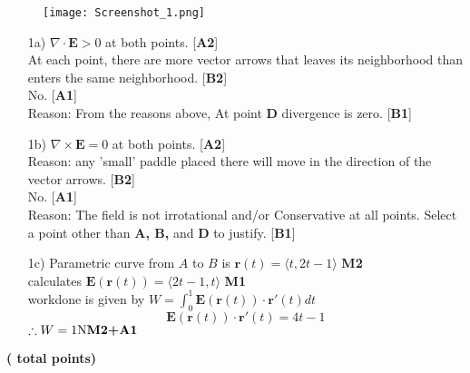 \documentclass[12pt]{exam}
\newcommand{\vr}{\mathbf{r}}
\newcommand{\vE}{\mathbf{E}}
\begin{document}
\begin{questions}
	\begin{figure}[h!]
		\centering
		\texttt{[image: Screenshot\_1.png]}
	\end{figure}
\begin{solution}
	\begin{enumerate}
		\item[1a) ]  $\nabla \cdot \vE> 0$ at both points. \hfill[\textbf{A2}]\\
					 At each point, there are more vector arrows that leaves its neighborhood than enters the same neighborhood. \hfill [\textbf{B2}]\\
					 No. \hfill[\textbf{A1}]\\
					 Reason: From the reasons above, At point \textbf{D} divergence is zero. \hfill [\textbf{B1}]
		\item[1b) ] $\nabla \times \vE= 0$ at both points. \hfill [\textbf{A2}]\\
		Reason: any 'small' paddle placed there will move in the direction of the vector arrows.  \hfill[\textbf{B2}]\\
		No. \hfill[\textbf{A1}]\\
		Reason: The field is not irrotational and/or Conservative at all points. Select a point other than \textbf{A, B,} and \textbf{D} to justify. \hfill[\textbf{B1}]
		\item[1c)] Parametric curve from $A$ to $B$ is $\vr(t)=\langle t, 2t-1\rangle$ \hfill \textbf{M2}\\
		
		calculates $\vE(\vr(t))=\langle 2t-1, t\rangle$ \hfill \textbf{M1}\\
		
		workdone is given by $W=\int_{0}^{1}\vE(\vr(t))\cdot \vr'(t)dt$\\
		$$\vE(\vr(t))\cdot \vr'(t) = 4t-1$$		
		$\therefore W=1\text{N} \hfill \textbf{M2+A1}$
	\end{enumerate}
\end{solution}


\question
\textbf{( total points)} $\ $
\begin{parts}

\end{parts}
\end{questions}
\end{document}
